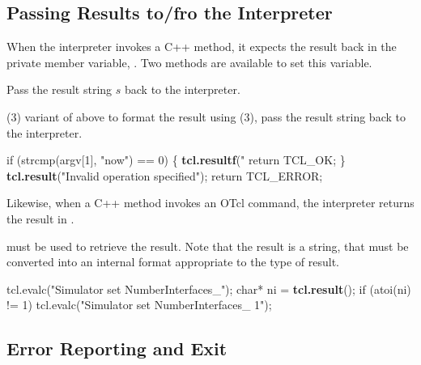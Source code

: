 \subsection{Passing Results to/fro the Interpreter}
\label{sec:Result}

When the interpreter invokes a C++ method,
it expects the result back in the private member variable,
.
Two methods are available to set this variable.
\begin{list}{\textbullet}{}
\item {}

        Pass the result string $s$ back to the interpreter.
\item

        (3) variant of above
        to format the result using (3),
        pass the result string back to the interpreter.
\end{list}
\begin{program}
        if (strcmp(argv[1], "now") == 0) \{
                {\bfseries{}tcl.resultf}("%
                return TCL_OK;
        \}
        {\bfseries{}tcl.result}("Invalid operation specified");
        return TCL_ERROR;
\end{program}

Likewise, when a C++ method invokes an OTcl command,
the interpreter returns the result in .
\begin{list}{\textbullet}{}
\item {}
      must be used to retrieve the result.
      Note that the result is a string, that must be converted
      into an internal format appropriate to the type of result.
\end{list}
\begin{program}
        tcl.evalc("Simulator set NumberInterfaces_");
        char* ni = {\bfseries{}tcl.result}();
        if (atoi(ni) != 1)
                tcl.evalc("Simulator set NumberInterfaces_ 1");
\end{program}
        
\subsection{Error Reporting and Exit}
\label{sec:ErrorReporting}

